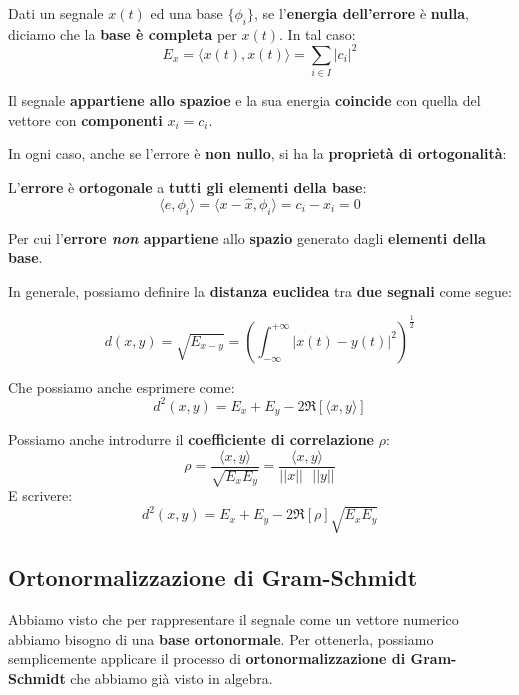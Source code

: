 Dati un segnale $x(t)$ ed una base $\{\phi_i\}$, se l'\textbf{energia dell'errore} 
è \textbf{nulla}, diciamo che la \textbf{base è completa} per $x(t)$.
In tal caso:
\[
    E_x = \langle x(t), x(t) \rangle = \sum_{i\in I} |c_i|^2
\]

\begin{remark}
    Il segnale \textbf{appartiene allo spazioe} e la sua energia 
    \textbf{coincide} con quella del vettore con \textbf{componenti} $x_i = c_i$.
\end{remark}

In ogni caso, anche se l'errore è \textbf{non nullo}, si ha la
\textbf{proprietà di ortogonalità}:

\begin{prop}
    L'\textbf{errore} è \textbf{ortogonale} a 
    \textbf{tutti gli elementi della base}:
    \[
        \langle e, \phi_i \rangle = \langle x - \hat{x} , \phi_i \rangle = c_i - x_i = 0
    \] 
\end{prop}

Per cui l'\textbf{errore \textit{non} appartiene} allo \textbf{spazio} generato
dagli \textbf{elementi della base}.

In generale, possiamo definire la \textbf{distanza euclidea} tra \textbf{due segnali}
come segue:

\begin{definition}
    \[
        d(x,y) = \sqrt{ E_{x-y} } = \left( 
        \int_{-\infty}^{+\infty} | x(t) - y(t) |^2 \right)^{\frac{1}{2}} 
    \] 
\end{definition}

Che possiamo anche esprimere come:
\[
    d^2 (x,y) = E_x + E_y - 2 \Re \left[ \langle x,y \rangle \right]
\]

Possiamo anche introdurre il \textbf{coefficiente di correlazione} $\rho$:
\[
    \rho = \frac{\langle x,y \rangle}{ \sqrt{E_x E_y} } = 
    \frac{\langle x,y \rangle}{||x|| \text{ } ||y||}
\]
E scrivere:
\[
    d^2(x,y) = E_x + E_y - 2 \Re[ \rho ] \sqrt{ E_x E_y} 
\]

\subsection{Ortonormalizzazione di Gram-Schmidt}

Abbiamo visto che per rappresentare il segnale come un vettore numerico abbiamo
bisogno di una \textbf{base ortonormale}. Per ottenerla, possiamo semplicemente
applicare il processo di \textbf{ortonormalizzazione di Gram-Schmidt} che
abbiamo già visto in algebra.


